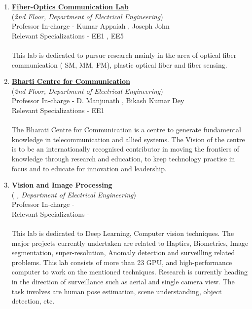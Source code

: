 \documentclass[openany]{book} %
\begin{document}
\begin{enumerate}
\item \href{https://www.ee.iitb.ac.in/~foclab/} {\color{blue} \textbf{Fiber-Optics Communication Lab}}\\
    (\textit{2nd Floor, Department of Electrical Engineering})\\
    Professor In-charge - Kumar Appaiah , Joseph John\\
Relevant Specializations - EE1 , EE5\\
\\
This lab is dedicated to pursue research mainly in the area of optical fiber communication ( SM, MM, FM), plastic optical fiber and fiber sensing.\\

\item \href{https://www.ee.iitb.ac.in/bharticentre/index.html} {\color{blue} \textbf{Bharti Centre for Communication}}\\
    (\textit{2nd Floor, Department of Electrical Engineering})\\
    Professor In-charge - D. Manjunath , Bikash Kumar Dey\\
Relevant Specializations - EE1\\
\\
The Bharati Centre for Communication is a centre to generate fundamental knowledge in telecommunication and allied systems. The Vision of the centre is to  be an internationally recognised contributor in moving the frontiers of knowledge through research and education, to keep technology practise in focus and to educate for innovation and leadership.\\

\item \textbf{Vision and Image Processing}\\
    (\textit{ , Department of Electrical Engineering})\\
    Professor In-charge - \\
Relevant Specializations - \\
\\
This lab is dedicated to Deep Learning, Computer vision techniques. The major projects currently undertaken are related to Haptics, Biometrics, Image segmentation, super-resolution, Anomaly detection and surveilling related problems. This lab consists of more than 23 GPU, and high-performance computer to work on the mentioned techniques. Research is currently heading in the direction of surveillance such as aerial and single camera view. The task involves are human pose estimation, scene understanding, object detection, etc.\\


\end{enumerate}
\end{document}
